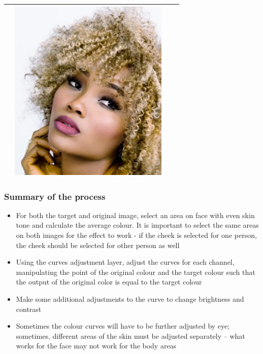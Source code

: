 \begin{longtable}{|N||c|c|c|}
\begin{minipage}{.29\textwidth}
  \end{minipage} & 
  \begin{minipage}{.29\textwidth}
    \includegraphics[width=\textwidth,height=\textheight,keepaspectratio]{images/match_other_2_res}
  \end{minipage} \\
    \hline
\end{longtable}

\subsubsection*{Summary of the process}
\begin{itemize}
  \item For both the target and original image, select an area on face with even skin tone and calculate the average colour. It is important to select the same areas on both images for the effect to work - if the cheek is selected for one person, the cheek should be selected for other person as well
  \item Using the curves adjustment layer, adjust the curves for each channel, manipulating the point of the original colour and the target colour such that the output of the original color is equal to the target colour
  \item Make some additional adjustments to the curve to change brightness and contrast
  \item Sometimes the colour curves will have to be further adjusted by eye; sometimes, different areas of the skin must be adjusted separately – what works for the face may not work for the body areas
\end{itemize}